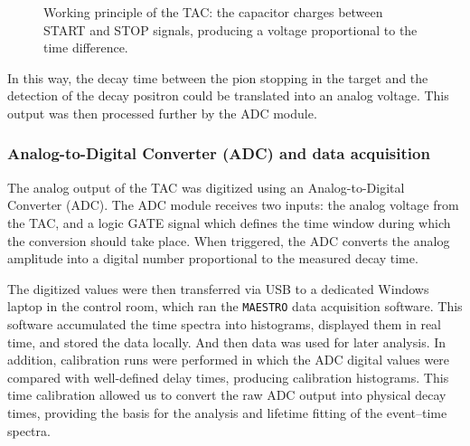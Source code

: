 \documentclass[11pt,a4paper]{article}
\begin{document}
\begin{figure}[h]
\centering
{}
\caption{Working principle of the TAC: the capacitor charges between START and STOP signals, producing a voltage proportional to the time difference.}
\end{figure}

In this way, the decay time between the pion stopping in the target and the detection of the decay positron could be translated into an analog voltage.
This output was then processed further by the ADC module.

\subsubsection{Analog-to-Digital Converter (ADC) and data acquisition}

The analog output of the TAC was digitized using an Analog-to-Digital Converter (ADC).
The ADC module receives two inputs: the analog voltage from the TAC, and a logic GATE signal which defines the time window during which the conversion should take place.
When triggered, the ADC converts the analog amplitude into a digital number proportional to the measured decay time.

The digitized values were then transferred via USB to a dedicated Windows laptop in the control room,
which ran the \texttt{MAESTRO} data acquisition software.
This software accumulated the time spectra into histograms, displayed them in real time, and stored the data locally. And then data was used for later analysis.
In addition, calibration runs were performed in which the ADC digital values were compared with well-defined delay times, producing calibration histograms.
This time calibration allowed us to convert the raw ADC output into physical decay times, providing the basis for the analysis and lifetime fitting of the event–time spectra.
\end{document}
